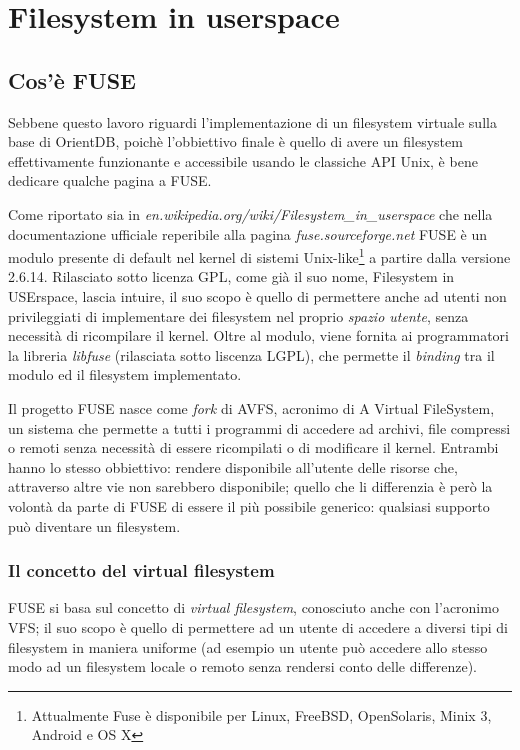 \chapter{Filesystem in userspace}
\section{Cos'è FUSE}
Sebbene questo lavoro riguardi l'implementazione di un filesystem virtuale sulla base di OrientDB, poichè l'obbiettivo finale è quello di avere un filesystem effettivamente funzionante e accessibile usando le classiche API Unix, è bene dedicare qualche pagina a FUSE.

Come riportato sia in \emph{en.wikipedia.org/wiki/Filesystem\_in\_userspace} che nella documentazione ufficiale reperibile alla pagina \emph{fuse.sourceforge.net} FUSE è un modulo presente  di default nel kernel di sistemi Unix-like\footnote{Attualmente Fuse è disponibile per Linux, FreeBSD, OpenSolaris, Minix 3, Android e OS X} a partire dalla versione 2.6.14. Rilasciato sotto licenza GPL, come già il suo nome, Filesystem in USErspace, lascia intuire, il suo scopo è quello di permettere anche ad utenti non privileggiati di implementare dei filesystem nel proprio \emph{spazio utente}, senza necessità di ricompilare il kernel. Oltre al modulo, viene fornita ai programmatori la libreria \emph{libfuse} (rilasciata sotto liscenza LGPL), che permette il \emph{binding} tra il modulo ed il filesystem implementato.

Il progetto FUSE nasce come \emph{fork} di AVFS, acronimo di A Virtual FileSystem, un sistema che permette a tutti i programmi di accedere ad archivi, file compressi o remoti senza necessità di essere ricompilati o di modificare il kernel. Entrambi hanno lo stesso obbiettivo: rendere disponibile all'utente delle risorse che, attraverso altre vie non sarebbero disponibile; quello che li differenzia è però la volontà da parte di FUSE di essere il più possibile generico: qualsiasi supporto può diventare un filesystem.

\subsection{Il concetto del virtual filesystem}
FUSE si basa sul concetto di \emph{virtual filesystem}, conosciuto anche con l'acronimo VFS; il suo scopo è quello di permettere ad un utente di accedere a diversi tipi di filesystem in maniera uniforme (ad esempio un utente può accedere allo stesso modo ad un filesystem locale o remoto senza rendersi conto delle differenze).

